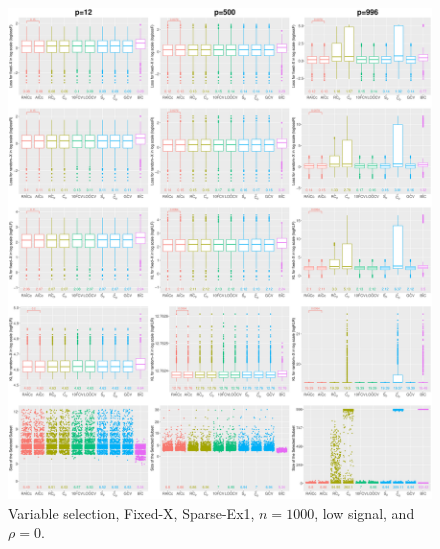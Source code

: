 \begin{figure}[!ht]
\centering
\includegraphics[width=\textwidth]{figures/supplement/fixedx/subset_selection/Sparse-Ex1_n1000_lsnr_rho0.eps}
\caption{Variable selection, Fixed-X, Sparse-Ex1, $n=1000$, low signal, and $\rho=0$.}
\end{figure}
\clearpage
